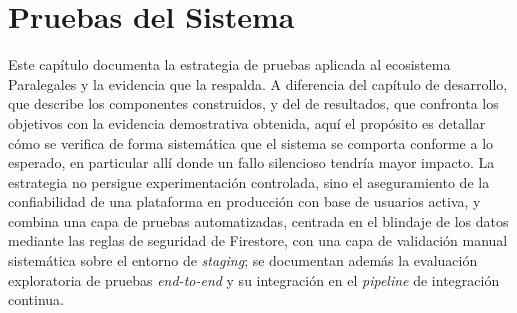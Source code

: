 \section{Pruebas del Sistema}

Este capítulo documenta la estrategia de pruebas aplicada al ecosistema Paralegales y la evidencia que la respalda. A diferencia del capítulo de desarrollo, que describe los componentes construidos, y del de resultados, que confronta los objetivos con la evidencia demostrativa obtenida, aquí el propósito es detallar cómo se verifica de forma sistemática que el sistema se comporta conforme a lo esperado, en particular allí donde un fallo silencioso tendría mayor impacto. La estrategia no persigue experimentación controlada, sino el aseguramiento de la confiabilidad de una plataforma en producción con base de usuarios activa, y combina una capa de pruebas automatizadas, centrada en el blindaje de los datos mediante las reglas de seguridad de Firestore, con una capa de validación manual sistemática sobre el entorno de \textit{staging}; se documentan además la evaluación exploratoria de pruebas \textit{end-to-end} y su integración en el \textit{pipeline} de integración continua.







